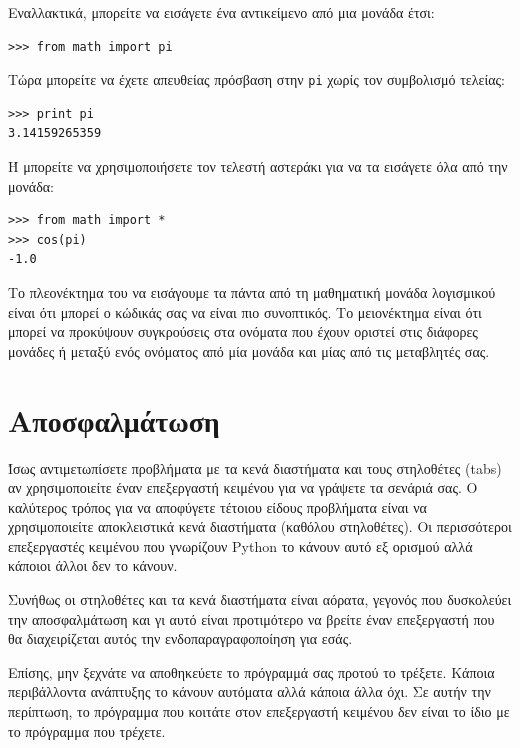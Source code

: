 \documentclass[10pt]{book}
\begin{document}
Εναλλακτικά, μπορείτε να εισάγετε ένα αντικείμενο από μια μονάδα έτσι:

\begin{verbatim}
>>> from math import pi
\end{verbatim}
%

Τώρα μπορείτε να έχετε απευθείας πρόσβαση στην {\tt pi} χωρίς
τον συμβολισμό τελείας:


\begin{verbatim}
>>> print pi
3.14159265359
\end{verbatim}
%

Ή μπορείτε να χρησιμοποιήσετε τον τελεστή αστεράκι για να τα εισάγετε
όλα από την μονάδα:


\begin{verbatim}
>>> from math import *
>>> cos(pi)
-1.0
\end{verbatim}


Το πλεονέκτημα του να εισάγουμε τα πάντα από τη μαθηματική μονάδα λογισμικού είναι ότι μπορεί ο κώδικάς σας να είναι πιο συνοπτικός. Το μειονέκτημα είναι ότι μπορεί να προκύψουν συγκρούσεις στα ονόματα που έχουν οριστεί στις διάφορες μονάδες ή μεταξύ ενός ονόματος από μία μονάδα και μίας από τις μεταβλητές σας.



\section{Αποσφαλμάτωση}
\label{editor}

Ίσως αντιμετωπίσετε προβλήματα με τα κενά διαστήματα και τους στηλοθέτες (tabs) αν χρησιμοποιείτε έναν επεξεργαστή κειμένου για να γράψετε τα σενάριά σας.
Ο καλύτερος τρόπος για να αποφύγετε τέτοιου είδους προβλήματα είναι να χρησιμοποιείτε αποκλειστικά κενά διαστήματα (καθόλου στηλοθέτες). Οι περισσότεροι επεξεργαστές κειμένου που γνωρίζουν Python το κάνουν αυτό εξ ορισμού αλλά κάποιοι άλλοι δεν το κάνουν.

Συνήθως οι στηλοθέτες και τα κενά διαστήματα είναι αόρατα, γεγονός που 
δυσκολεύει την αποσφαλμάτωση και γι αυτό  είναι προτιμότερο να βρείτε έναν επεξεργαστή που θα διαχειρίζεται αυτός την ενδοπαραγραφοποίηση για εσάς.

Επίσης, μην ξεχνάτε να αποθηκεύετε το πρόγραμμά σας προτού το τρέξετε.
Κάποια περιβάλλοντα ανάπτυξης το κάνουν αυτόματα αλλά κάποια άλλα όχι.
Σε αυτήν την περίπτωση, το πρόγραμμα που κοιτάτε στον επεξεργαστή κειμένου δεν είναι το ίδιο με το πρόγραμμα που τρέχετε.
\end{document}
